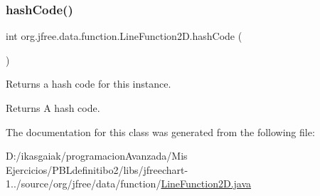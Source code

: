 \mbox{\label{classorg_1_1jfree_1_1data_1_1function_1_1_line_function2_d_a40a0d5b1616f79b6db2a6d31e152e6ba}} 
\subsubsection{\texorpdfstring{hash\+Code()}{hashCode()}}
{\footnotesize\ttfamily int org.\+jfree.\+data.\+function.\+Line\+Function2\+D.\+hash\+Code (\begin{DoxyParamCaption}{ }\end{DoxyParamCaption})}

Returns a hash code for this instance.

\begin{DoxyReturn}{Returns}
A hash code. 
\end{DoxyReturn}


The documentation for this class was generated from the following file\+:\begin{DoxyCompactItemize}
\item 
D\+:/ikasgaiak/programacion\+Avanzada/\+Mis Ejercicios/\+P\+B\+Ldefinitibo2/libs/jfreechart-\/1../source/org/jfree/data/function/\mbox{\hyperlink{_line_function2_d_8java}{Line\+Function2\+D.\+java}}\end{DoxyCompactItemize}
